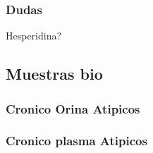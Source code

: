 \documentclass[
]{article}
\begin{document}
\hypertarget{dudas}{%
\subsubsection{Dudas}\label{dudas}}

Hesperidina?

\hypertarget{muestras-bio}{%
\subsection{Muestras bio}\label{muestras-bio}}

\hypertarget{cronico-orina-atipicos}{%
\subsubsection{Cronico Orina Atipicos}\label{cronico-orina-atipicos}}

\hypertarget{cronico-plasma-atipicos}{%
\subsubsection{Cronico plasma Atipicos}\label{cronico-plasma-atipicos}}
\end{document}
